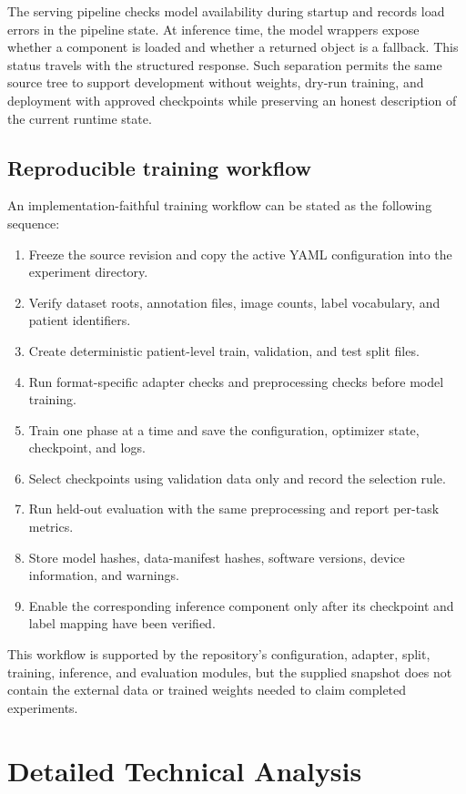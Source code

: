 \documentclass[12pt,a4paper]{article}
\begin{document}
The serving pipeline checks model availability during startup and records load errors in the pipeline state. At inference time, the model wrappers expose whether a component is loaded and whether a returned object is a fallback. This status travels with the structured response. Such separation permits the same source tree to support development without weights, dry-run training, and deployment with approved checkpoints while preserving an honest description of the current runtime state.

\subsection{Reproducible training workflow}
An implementation-faithful training workflow can be stated as the following sequence:
\begin{enumerate}[leftmargin=30pt,label=\arabic*.]
\item Freeze the source revision and copy the active YAML configuration into the experiment directory.
\item Verify dataset roots, annotation files, image counts, label vocabulary, and patient identifiers.
\item Create deterministic patient-level train, validation, and test split files.
\item Run format-specific adapter checks and preprocessing checks before model training.
\item Train one phase at a time and save the configuration, optimizer state, checkpoint, and logs.
\item Select checkpoints using validation data only and record the selection rule.
\item Run held-out evaluation with the same preprocessing and report per-task metrics.
\item Store model hashes, data-manifest hashes, software versions, device information, and warnings.
\item Enable the corresponding inference component only after its checkpoint and label mapping have been verified.
\end{enumerate}

This workflow is supported by the repository's configuration, adapter, split, training, inference, and evaluation modules, but the supplied snapshot does not contain the external data or trained weights needed to claim completed experiments.

\clearpage
\section{Detailed Technical Analysis}
\setcounter{table}{0}
\renewcommand{\thetable}{9.\arabic{table}}
\end{document}
